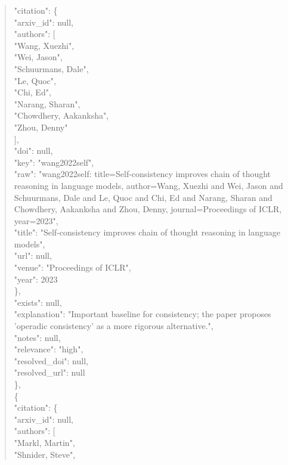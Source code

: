\documentclass[11pt]{article}
\begin{document}
\begin{quote}
      "citation": \{\\
        "arxiv\_id": null,\\
        "authors": [\\
          "Wang, Xuezhi",\\
          "Wei, Jason",\\
          "Schuurmans, Dale",\\
          "Le, Quoc",\\
          "Chi, Ed",\\
          "Narang, Sharan",\\
          "Chowdhery, Aakanksha",\\
          "Zhou, Denny"\\
        ],\\
        "doi": null,\\
        "key": "wang2022self",\\
        "raw": "wang2022self: title=Self-consistency improves chain of thought reasoning in language models, author=Wang, Xuezhi and Wei, Jason and Schuurmans, Dale and Le, Quoc and Chi, Ed and Narang, Sharan and Chowdhery, Aakanksha and Zhou, Denny, journal=Proceedings of ICLR, year=2023",\\
        "title": "Self-consistency improves chain of thought reasoning in language models",\\
        "url": null,\\
        "venue": "Proceedings of ICLR",\\
        "year": 2023\\
      \},\\
      "exists": null,\\
      "explanation": "Important baseline for consistency; the paper proposes 'operadic consistency' as a more rigorous alternative.",\\
      "notes": null,\\
      "relevance": "high",\\
      "resolved\_doi": null,\\
      "resolved\_url": null\\
    \},\\
    \{\\
      "citation": \{\\
        "arxiv\_id": null,\\
        "authors": [\\
          "Markl, Martin",\\
          "Shnider, Steve",\\

\end{quote}
\end{document}
